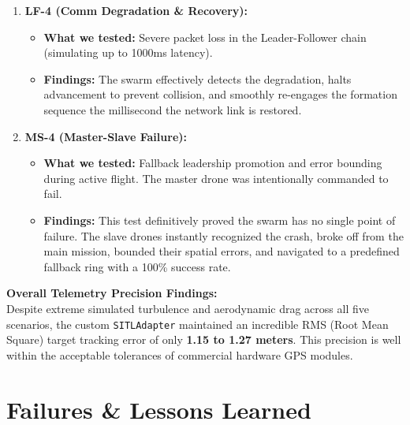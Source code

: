 \documentclass[11pt,a4paper]{article}
\newcommand{\code}[1]{\lstinline[basicstyle=\ttfamily\small,columns=fullflexible]|#1|}
\begin{document}
\begin{enumerate}[leftmargin=1.8em]
    \item \textbf{LF-4 (Comm Degradation \& Recovery):}
    \begin{itemize}[leftmargin=1.5em]
        \item \textbf{What we tested:} Severe packet loss in the Leader-Follower chain (simulating up to 1000ms latency).
        \item \textbf{Findings:} The swarm effectively detects the degradation, halts advancement to prevent collision, and smoothly re-engages the formation sequence the millisecond the network link is restored.
    \end{itemize}

    \item \textbf{MS-4 (Master-Slave Failure):}
    \begin{itemize}[leftmargin=1.5em]
        \item \textbf{What we tested:} Fallback leadership promotion and error bounding during active flight. The master drone was intentionally commanded to fail.
        \item \textbf{Findings:} This test definitively proved the swarm has no single point of failure. The slave drones instantly recognized the crash, broke off from the main mission, bounded their spatial errors, and navigated to a predefined fallback ring with a 100\% success rate.
    \end{itemize}
\end{enumerate}

\textbf{Overall Telemetry Precision Findings:}\\
Despite extreme simulated turbulence and aerodynamic drag across all five scenarios, the custom \code{SITLAdapter} maintained an incredible RMS (Root Mean Square) target tracking error of only \textbf{1.15 to 1.27 meters}. This precision is well within the acceptable tolerances of commercial hardware GPS modules.

\section{Failures \& Lessons Learned}
\end{document}
